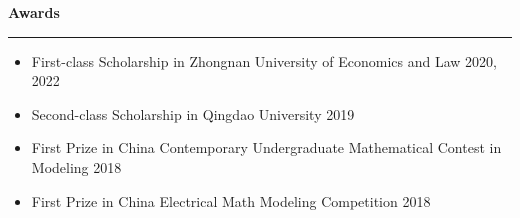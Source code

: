 \documentclass[a4paper,10pt]{article}
\newcommand{\resheading}[1]{
  \vspace{8pt}
  \noindent\textbf{\large #1}
  \vspace{4pt}
  \hrule
  \vspace{8pt}
}
\begin{document}
\resheading{Awards}
\begin{itemize}[left=0pt, label={}, itemsep=-8pt]
    \item First-class Scholarship in Zhongnan University of Economics and Law \hfill 2020, 2022 \\
    \item Second-class Scholarship in Qingdao University \hfill 2019  \\
    \item First Prize in China Contemporary Undergraduate Mathematical Contest in Modeling \hfill 2018  \\
    \item First Prize in China Electrical Math Modeling Competition \hfill 2018  \\
\end{itemize}
\end{document}
